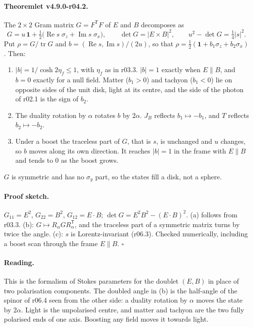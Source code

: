 \paragraph{Theoremlet v4.9.0-r04.2.}
The \(2\times2\) Gram matrix \(G=F^{\mathsf T}F\) of \(E\) and \(B\) decomposes as
\[
G=u\,\mathbf 1+\tfrac12\bigl(\operatorname{Re}s\;\sigma_z+\operatorname{Im}s\;\sigma_x\bigr),
\qquad
\det G=|E\times B|^2,\qquad
u^2-\det G=\tfrac14|s|^2 .
\]
Put \(\rho=G/\operatorname{tr}G\) and \(b=(\operatorname{Re}s,\operatorname{Im}s)/(2u)\), so that
\(\rho=\tfrac12(\mathbf 1+b_1\sigma_z+b_2\sigma_x)\).  Then:
\begin{enumerate}[leftmargin=2em]
\item[(a)] \(|b|=1/\cosh2\eta_f\le1\), with \(\eta_f\) as in r03.3.  \(|b|=1\) exactly when \(E\parallel B\), and \(b=0\)
exactly for a null field.  Matter (\(b_1>0\)) and tachyon (\(b_1<0\)) lie on opposite sides of the unit disk, light at its
centre, and the side of the photon of r02.1 is the sign of \(b_2\).
\item[(b)] The duality rotation by \(\alpha\) rotates \(b\) by \(2\alpha\).  \(J_B\) reflects \(b_1\mapsto-b_1\), and
\(T\) reflects \(b_2\mapsto-b_2\).
\item[(c)] Under a boost the traceless part of \(G\), that is \(s\), is unchanged and \(u\) changes, so \(b\) moves along its
own direction.  It reaches \(|b|=1\) in the frame with \(E\parallel B\) and tends to \(0\) as the boost grows.
\end{enumerate}
\(G\) is symmetric and has no \(\sigma_y\) part, so the states fill a disk, not a sphere.

\paragraph{Proof sketch.}
\(G_{11}=E^2\), \(G_{22}=B^2\), \(G_{12}=E\cdot B\); \(\det G=E^2B^2-(E\cdot B)^2\).  (a) follows from r03.3.  (b): \(G\mapsto
R_\alpha GR_\alpha^{\mathsf T}\), and the traceless part of a symmetric matrix turns by twice the angle.  (c): \(s\) is
Lorentz-invariant (r06.3).  Checked numerically, including a boost scan through the frame \(E\parallel B\).  \(\square\)

\paragraph{Reading.}
This is the formalism of Stokes parameters for the doublet \((E,B)\) in place of two polarisation components.  The doubled
angle in (b) is the half-angle of the spinor of r06.4 seen from the other side: a duality rotation by \(\alpha\) moves the
state by \(2\alpha\).  Light is the unpolarised centre, and matter and tachyon are the two fully polarised ends of one
axis.  Boosting any field moves it towards light.

